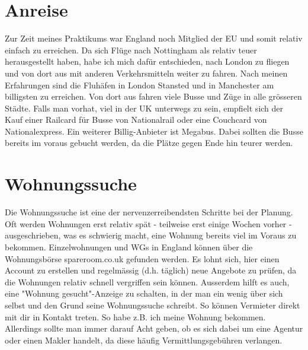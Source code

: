 \documentclass{article}
\begin{document}
\section{Anreise}
Zur Zeit meines Praktikums war England noch Mitglied der EU und somit relativ einfach zu erreichen. Da sich Fl\"uge nach Nottingham als relativ teuer herausgestellt haben, habe ich mich daf\"ur entschieden, nach London zu fliegen und von dort aus mit anderen Verkehrsmitteln weiter zu fahren. Nach meinen Erfahrungen sind die Fluh\"afen in London Stansted und in Manchester am billigsten zu erreichen. Von dort aus fahren viele Busse und Z\"uge in alle gr\"osseren St\"adte. Falls man vorhat, viel in der UK unterwegs zu sein, empfielt sich der Kauf einer Railcard f\"ur Busse von Nationalrail oder eine Couchcard von Nationalexpress. Ein weiterer Billig-Anbieter ist Megabus. Dabei sollten die Busse bereits im voraus gebucht werden, da die Pl\"atze gegen Ende hin teurer werden.

\section{Wohnungssuche}
Die Wohnungssuche ist eine der nervenzerreibendsten Schritte bei der Planung. Oft werden Wohnungen erst relativ sp\"at - teilweise erst einige Wochen vorher - ausgeschrieben, was es schwierig macht, eine Wohnung bereits viel im Voraus zu bekommen. Einzelwohnungen und WGs in England k\"onnen \"uber die Wohnungsb\"orse spareroom.co.uk gefunden werden. Es lohnt sich, hier einen Account zu erstellen und regelm\"assig (d.h. t\"aglich) neue Angebote zu pr\"ufen, da die Wohnungen relativ schnell vergriffen sein k\"onnen. Ausserdem hilft es auch, eine "Wohnung gesucht"-Anzeige zu schalten, in der man ein wenig \"uber sich selbst und den Grund seine Wohnungssuche schreibt. So k\"onnen Vermieter direkt mit dir in Kontakt treten. So habe z.B. ich meine Wohnung bekommen. Allerdings sollte man immer darauf Acht geben, ob es sich dabei um eine Agentur oder einen Makler handelt, da diese h\"aufig Vermittlungsgeb\"uhren verlangen.
\end{document}
